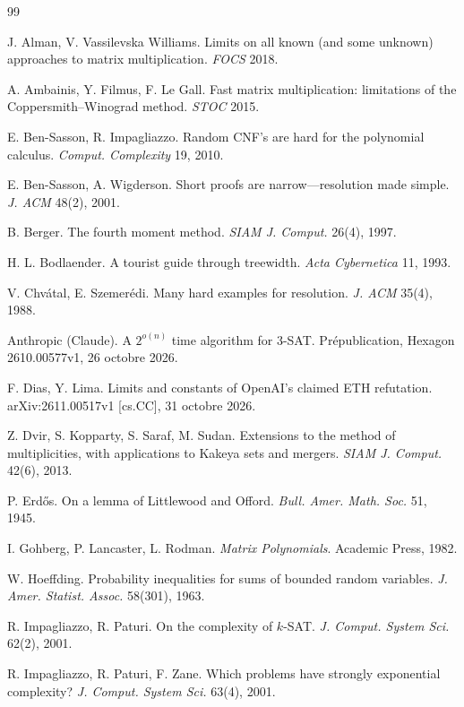 \documentclass[11pt,a4paper]{article}
\makeatletter
\theoremstyle{definition}
\theoremstyle{remark}
\newcommand{\englishhyph}{\@ifundefined{l@english}{}{\language\l@english}}
\makeatother
\begin{document}
\begin{thebibliography}{99}
\englishhyph

 J. Alman, V. Vassilevska Williams. Limits on all known (and some unknown)
 approaches to matrix multiplication. \emph{FOCS} 2018.

 A. Ambainis, Y. Filmus, F. Le Gall. Fast matrix multiplication: limitations
 of the Coppersmith--Winograd method. \emph{STOC} 2015.

 E. Ben-Sasson, R. Impagliazzo. Random CNF's are hard for the polynomial
 calculus. \emph{Comput. Complexity} 19, 2010.

 E. Ben-Sasson, A. Wigderson. Short proofs are narrow---resolution made
 simple. \emph{J. ACM} 48(2), 2001.

 B. Berger. The fourth moment method. \emph{SIAM J. Comput.} 26(4), 1997.

 H. L. Bodlaender. A tourist guide through treewidth. \emph{Acta Cybernetica}
 11, 1993.

 V. Chv\'atal, E. Szemer\'edi. Many hard examples for resolution.
 \emph{J. ACM} 35(4), 1988.

 Anthropic (Claude). A $2^{o(n)}$ time algorithm for 3-SAT. Prépublication,
 Hexagon 2610.00577v1, 26 octobre 2026.

 F. Dias, Y. Lima. Limits and constants of OpenAI's claimed ETH refutation.
 arXiv:2611.00517v1 [cs.CC], 31 octobre 2026.

 Z. Dvir, S. Kopparty, S. Saraf, M. Sudan. Extensions to the method of
 multiplicities, with applications to Kakeya sets and mergers. \emph{SIAM J. Comput.} 42(6),
 2013.

 P. Erd\H{o}s. On a lemma of Littlewood and Offord. \emph{Bull. Amer. Math.
 Soc.} 51, 1945.

 I. Gohberg, P. Lancaster, L. Rodman. \emph{Matrix Polynomials}. Academic
 Press, 1982.

 W. Hoeffding. Probability inequalities for sums of bounded random variables.
 \emph{J. Amer. Statist. Assoc.} 58(301), 1963.

 R. Impagliazzo, R. Paturi. On the complexity of $k$-SAT. \emph{J. Comput.
 System Sci.} 62(2), 2001.

 R. Impagliazzo, R. Paturi, F. Zane. Which problems have strongly exponential
 complexity? \emph{J. Comput. System Sci.} 63(4), 2001.


\end{thebibliography}
\end{document}
